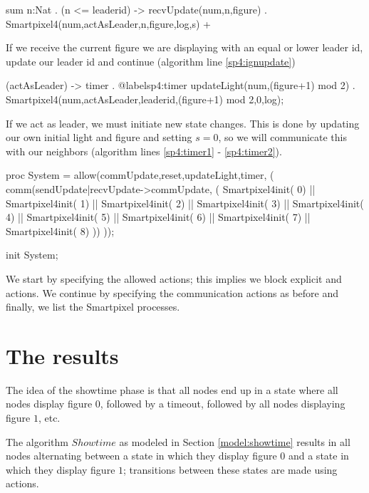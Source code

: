 \begin{codeverb}
sum n:Nat . (n <= leaderid) -> recvUpdate(num,n,figure) .
        Smartpixel4(num,actAsLeader,n,figure,log,s) +
\end{codeverb}

If we receive the current figure we are displaying with an equal or lower leader id, update our leader id and continue (algorithm line \ref{sp4:ignupdate})

\begin{codeverb}
(actAsLeader) -> timer .       @label{sp4:timer}
           updateLight(num,(figure+1) mod 2) .
           Smartpixel4(num,actAsLeader,leaderid,(figure+1) mod 2,0,log);
\end{codeverb}

If we act as leader, we must initiate new state changes. This is done by updating our own initial light and figure and setting $s = 0$, so we will communicate this with our neighbors (algorithm lines \ref{sp4:timer1} - \ref{sp4:timer2}).

\begin{codeverb}
proc    System =
         allow({commUpdate,reset,updateLight,timer}, (
          comm({sendUpdate|recvUpdate->commUpdate}, (
             Smartpixel4init( 0) || Smartpixel4init( 1) || Smartpixel4init( 2) ||
             Smartpixel4init( 3) || Smartpixel4init( 4) || Smartpixel4init( 5) ||
             Smartpixel4init( 6) || Smartpixel4init( 7) || Smartpixel4init( 8)
          ))
         ));

init    System;
\end{codeverb}

We start by specifying the allowed actions; this implies we block explicit  and  actions. We continue by specifying the communication actions as before and finally, we list the Smartpixel processes.

\section{The results}

The idea of the showtime phase is that all nodes end up in a state where all nodes display figure $0$, followed by a timeout, followed by all nodes displaying figure $1$, etc. 
\\
\begin{property} \label{prop:showtime}
The algorithm $Showtime$ as modeled in Section \ref{model:showtime} results in all nodes alternating between a state in which they display figure $0$ and a state in which they display figure $1$; transitions between these states are made using  actions.
\end{property}

